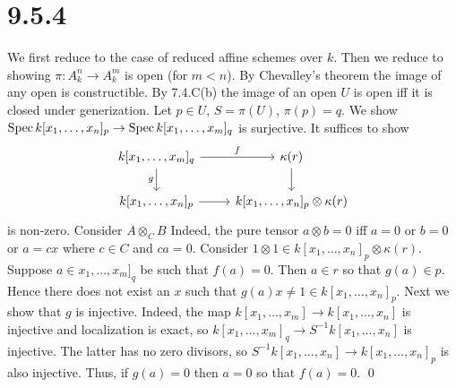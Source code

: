 \documentclass{article}
\begin{document}
\section{9.5.4}
We first reduce to the case of reduced affine schemes over
$k$. Then we reduce to showing $\pi: A^n_k \to A^m_k$ is
open (for $m < n$). By Chevalley's theorem the image of any open
is constructible. By 7.4.C(b) the image of an open $U$ is
open iff it is closed under generization. Let $p \in U$,
$S=\pi(U)$, $\pi(p)=q$. We show $\operatorname{Spec} k[x_1, \dots, x_n]_p \to \operatorname{Spec}
    k[x_1, \dots, x_m]_q$
is surjective. It suffices to show \[\begin{tikzcd}
        {k[x_1, \dots, x_m]_q}                        & {\kappa(r)}
        \\{k[x_1, \dots,x_n]_p} &
        {k[x_1, \dots,x_n]_p \otimes \kappa(r)}
        \arrow["f", from=1-1, to=1-2]
        \arrow["g"', from=1-1, to=2-1]
        \arrow[from=1-2, to=2-2]
        \arrow[from=2-1, to=2-2]
    \end{tikzcd}\] is non-zero. Consider
$A \otimes_C B$ Indeed, the pure tensor $a \otimes b = 0$ iff
$a=0$ or $b=0$ or $a=cx$
where $c \in C$ and $ca=0$. Consider
$1 \otimes 1 \in k[x_1, \dots,x_n]_p \otimes \kappa(r)$. Suppose $a \in x_1, \dots, x_m]_q$ be such that
$f(a)=0$. Then $a \in r$ so that
$g(a) \in p$. Hence there does not exist an $x$
such that $g(a)x \neq 1 \in k[x_1, \dots,x_n]_p$. Next we show that $g$ is
injective. Indeed, the map $k[x_1, \dots, x_m] \to k[x_1, \dots, x_n]$ is injective and localization
is exact, so $k[x_1, \dots, x_m]_q \to S^{-1}k[x_1,
    \dots, x_n]$ is injective. The latter has no zero
divisors, so $S^{-1}k[x_1, \dots, x_n] \to
    k[x_1, \dots, x_n]_p$ is also injective. Thus, if
$g(a)=0$ then $a=0$ so that
$f(a)=0$. \qed
\end{document}
